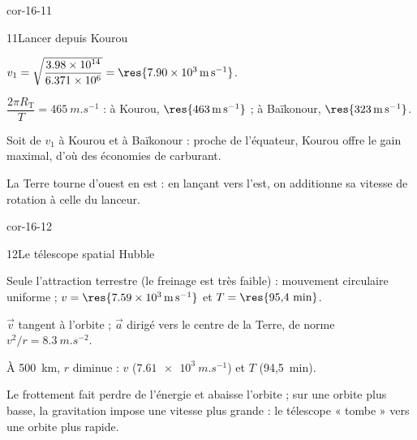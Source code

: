 \begin{blocLivre}{cor-16-11}
\begin{corrige}{11}{Lancer depuis Kourou}
\begin{questions}
\item $v_1=\sqrt{\dfrac{\num{3.98e14}}{\num{6.371e6}}}=\res{\qty{7,90e3}{m.s^{-1}}}$.
\item $\dfrac{2\pi R_\mathrm{T}}{T}=\qty{465}{m.s^{-1}}$ : à Kourou, $\res{\qty{463}{m.s^{-1}}}$ ; à Baïkonour, $\res{\qty{323}{m.s^{-1}}}$.
\item Soit  de $v_1$ à Kourou et  à Baïkonour : proche de l'équateur, Kourou offre le gain maximal,
d'où des économies de carburant.
\item La Terre tourne d'ouest en est : en lançant vers l'est, on additionne sa vitesse de rotation à celle du lanceur.
\end{questions}
\end{corrige}
\end{blocLivre}
\begin{blocLivre}{cor-16-12}
\begin{corrige}{12}{Le télescope spatial Hubble}
\begin{questions}
\item Seule l'attraction terrestre (le freinage est très faible) : mouvement circulaire uniforme ;
$v=\res{\qty{7,59e3}{m.s^{-1}}}$ et $T=\res{95{,}4~\text{min}}$.
\item $\vec{v}$ tangent à l'orbite ; $\vec{a}$ dirigé vers le centre de la Terre, de norme $v^2/r=\qty{8,3}{m.s^{-2}}$.
\item À 500~km, $r$ diminue : $v$  ($\qty{7,61e3}{m.s^{-1}}$) et $T$  (94,5~min).
\item Le frottement fait perdre de l'énergie et abaisse l'orbite ; sur une orbite plus basse, la gravitation impose une
vitesse plus grande : le télescope « tombe » vers une orbite plus rapide.
\end{questions}
\end{corrige}
\end{blocLivre}
